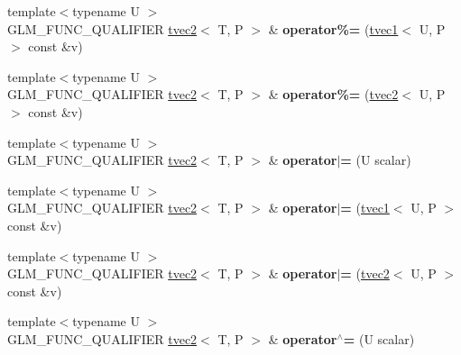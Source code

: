 \begin{DoxyCompactItemize}
{\footnotesize template$<$typename U $>$ }\\G\+L\+M\+\_\+\+F\+U\+N\+C\+\_\+\+Q\+U\+A\+L\+I\+F\+I\+ER \hyperlink{structglm_1_1tvec2}{tvec2}$<$ T, P $>$ \& {\bfseries operator\%=} (\hyperlink{structglm_1_1tvec1}{tvec1}$<$ U, P $>$ const \&v)
\item 
\mbox{\label{structglm_1_1tvec2_aaf4c73ee8e801c26093def1d49df1df1}} 
{\footnotesize template$<$typename U $>$ }\\G\+L\+M\+\_\+\+F\+U\+N\+C\+\_\+\+Q\+U\+A\+L\+I\+F\+I\+ER \hyperlink{structglm_1_1tvec2}{tvec2}$<$ T, P $>$ \& {\bfseries operator\%=} (\hyperlink{structglm_1_1tvec2}{tvec2}$<$ U, P $>$ const \&v)
\item 
\mbox{\label{structglm_1_1tvec2_a1eff9e49c1834396e38d1a59fb0ab910}} 
{\footnotesize template$<$typename U $>$ }\\G\+L\+M\+\_\+\+F\+U\+N\+C\+\_\+\+Q\+U\+A\+L\+I\+F\+I\+ER \hyperlink{structglm_1_1tvec2}{tvec2}$<$ T, P $>$ \& {\bfseries operator$\vert$=} (U scalar)
\item 
\mbox{\label{structglm_1_1tvec2_a843e403f0c04d10bcbe3a7ffe63454b9}} 
{\footnotesize template$<$typename U $>$ }\\G\+L\+M\+\_\+\+F\+U\+N\+C\+\_\+\+Q\+U\+A\+L\+I\+F\+I\+ER \hyperlink{structglm_1_1tvec2}{tvec2}$<$ T, P $>$ \& {\bfseries operator$\vert$=} (\hyperlink{structglm_1_1tvec1}{tvec1}$<$ U, P $>$ const \&v)
\item 
\mbox{\label{structglm_1_1tvec2_aa36fb52ee5d9c58525c1e82edfdadc70}} 
{\footnotesize template$<$typename U $>$ }\\G\+L\+M\+\_\+\+F\+U\+N\+C\+\_\+\+Q\+U\+A\+L\+I\+F\+I\+ER \hyperlink{structglm_1_1tvec2}{tvec2}$<$ T, P $>$ \& {\bfseries operator$\vert$=} (\hyperlink{structglm_1_1tvec2}{tvec2}$<$ U, P $>$ const \&v)
\item 
\mbox{\label{structglm_1_1tvec2_a5026bdfe8ccedecefd92963b117b33d3}} 
{\footnotesize template$<$typename U $>$ }\\G\+L\+M\+\_\+\+F\+U\+N\+C\+\_\+\+Q\+U\+A\+L\+I\+F\+I\+ER \hyperlink{structglm_1_1tvec2}{tvec2}$<$ T, P $>$ \& {\bfseries operator$^\wedge$=} (U scalar)
\item 
\mbox{\label{structglm_1_1tvec2_a2b88448c05b92b3a1f32b19f0698a53a}} 

\end{DoxyCompactItemize}
